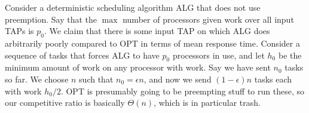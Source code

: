 Consider a deterministic scheduling algorithm ALG that does not
use preemption. Say that the $\max$ number of processors given
work over all input TAPs is $p_0$. We claim that there is some
input TAP on which ALG does arbitrarily poorly compared to OPT in
terms of mean response time.
Consider a sequence of tasks that forces ALG to have $p_0$
processors in use, and let $h_0$ be the minimum amount of work on
any processor with work. Say we have sent $n_0$ tasks so far.
We choose $n$ such that $n_0 = \epsilon n$, and now we send
$(1-\epsilon)n$ tasks each with work $h_0/2$. OPT is presumably
going to be preempting stuff to run these, so our competitive
ratio is basically $\Theta(n)$, which is in particular trash.


